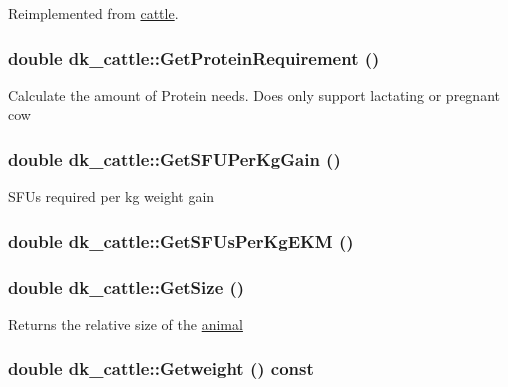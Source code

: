 Reimplemented from \hyperlink{classcattle_ab885604f6912a5bfadc8a71d42e72328}{cattle}.\hypertarget{classdk__cattle_a578f816fbeb4c0350d26f9a16f2cae41}{
\subsubsection[{GetProteinRequirement}]{\setlength{\rightskip}{0pt plus 5cm}double dk\_\-cattle::GetProteinRequirement ()}}
\label{classdk__cattle_a578f816fbeb4c0350d26f9a16f2cae41}
Calculate the amount of Protein needs. Does only support lactating or pregnant cow \hypertarget{classdk__cattle_ac50410fe44f32c4912f72941c8573fc0}{
\subsubsection[{GetSFUPerKgGain}]{\setlength{\rightskip}{0pt plus 5cm}double dk\_\-cattle::GetSFUPerKgGain ()}}
\label{classdk__cattle_ac50410fe44f32c4912f72941c8573fc0}
SFUs required per kg weight gain \hypertarget{classdk__cattle_af804b9a5a6885aea3e7aaee3b098c043}{
\subsubsection[{GetSFUsPerKgEKM}]{\setlength{\rightskip}{0pt plus 5cm}double dk\_\-cattle::GetSFUsPerKgEKM ()}}
\label{classdk__cattle_af804b9a5a6885aea3e7aaee3b098c043}
\hypertarget{classdk__cattle_afb8648a1b743db0ee7fb8c2cecdfaad7}{
\subsubsection[{GetSize}]{\setlength{\rightskip}{0pt plus 5cm}double dk\_\-cattle::GetSize ()}}
\label{classdk__cattle_afb8648a1b743db0ee7fb8c2cecdfaad7}
Returns the relative size of the \hyperlink{classanimal}{animal} \hypertarget{classdk__cattle_a2c73fdc5a59294459de1a0a193e9ea3a}{
\subsubsection[{Getweight}]{\setlength{\rightskip}{0pt plus 5cm}double dk\_\-cattle::Getweight () const}}
\label{classdk__cattle_a2c73fdc5a59294459de1a0a193e9ea3a}


